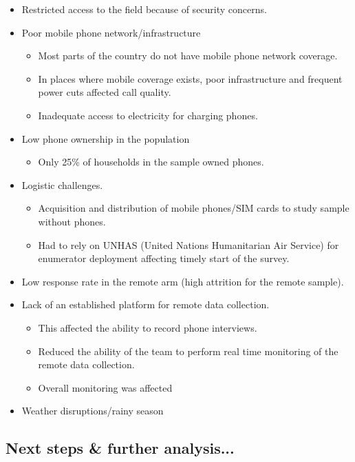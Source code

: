 \documentclass[11pt,harvard]{article}
\begin{document}
	\begin{itemize}[label=--, left=2.5em]
		\item[1.] Restricted access to the field because of security concerns.
		\item[2.] Poor mobile phone network/infrastructure 
		\begin{itemize}[label=--, left=1.75em]
			\item[a.]	Most parts of the country do not have mobile phone network coverage.
			\item[b.]	In places where mobile coverage exists, poor infrastructure and frequent power cuts affected call quality.
			\item[c.]	Inadequate access to electricity for charging phones.
		\end{itemize}
		\item[3.] Low phone ownership in the population
			\begin{itemize}[label=--, left=1.75em]
				\item[a.] Only 25\% of households in the sample owned phones.
			\end{itemize}
		\item[4.] Logistic challenges.
			\begin{itemize}[label=--, left=1.75em]
				\item[a.]	Acquisition and distribution of mobile phones/SIM cards to study sample without phones.
				\item[b.]	Had to rely on UNHAS (United Nations Humanitarian Air Service) for enumerator deployment affecting timely start of the survey.
			\end{itemize}
		\item[5.] Low response rate in the remote arm (high attrition for the remote sample).
		\item[6.] Lack of an established platform for remote data collection. 
			\begin{itemize}[label=--, left=1.75em]
				\item [a.] This affected the ability to record phone interviews.
				\item [b.] Reduced the ability of the team to perform real time monitoring of the remote data collection.
				\item [c.] Overall monitoring was affected
			\end{itemize}
		\item[7.] Weather disruptions/rainy season
	\end{itemize}
	

\subsection{Next steps \& further analysis...}
\end{document}
